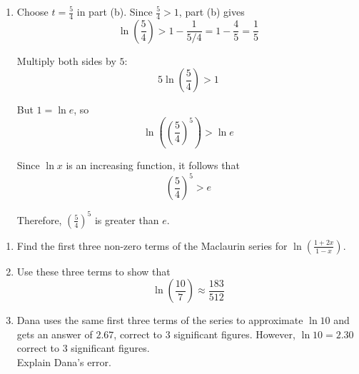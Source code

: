 \documentclass[leqno]{article}
\begin{document}
\begin{enumerate}[
  label=\textbf{\arabic*.},
  leftmargin=*,
  topsep=0pt,
  partopsep=0pt,
  parsep=0pt
]
\begin{djsSolution}
\begin{enumerate}[label=\textbf{(\alph*)}]
  If $t>1$, then $0<x<1$, so part (a) applies:
  \[
  -\ln(1-x)>x
  \]

  Substituting $x=1-\frac1t$ gives
  \begin{align*}
  -\ln\left(1-\left(1-\frac1t\right)\right)&>1-\frac1t \\
  -\ln\left(\frac1t\right)&>1-\frac1t \\
  \ln t&>1-\frac1t
  \end{align*}

  So, for $t>1$:
  \[
  \ln t>1-\frac1t
  \]

  \item Choose $t=\frac54$ in part (b). Since $\frac54>1$, part (b) gives
  \[
  \ln\left(\frac54\right)>1-\frac{1}{5/4}=1-\frac45=\frac15
  \]

  Multiply both sides by $5$:
  \[
  5\ln\left(\frac54\right)>1
  \]

  But $1=\ln e$, so
  \[
  \ln\left(\left(\frac54\right)^5\right)>\ln e
  \]

  Since $\ln x$ is an increasing function, it follows that
  \[
  \left(\frac54\right)^5>e
  \]

  Therefore, $\left(\frac54\right)^5$ is greater than $e$.
\end{enumerate}
\end{djsSolution}


\newpage

\questionitem

\begin{enumerate}[label=\textbf{(\alph*)}]
  \item Find the first three non-zero terms of the Maclaurin series for $\ln\left(\frac{1+2x}{1-x}\right)$.  \\
  \item Use these three terms to show that
  \[
  \ln\left(\dfrac{10}{7}\right) \approx \dfrac{183}{512}
  \]
  \item Dana uses the same first three terms of the series to approximate $\ln 10$ and gets an answer of $2.67$, correct to $3$ significant figures. However, $\ln 10 = 2.30$ correct to $3$ significant figures. \\

  Explain Dana's error.  \\
\end{enumerate}

\vspace*{10pt}


\end{enumerate}
\end{document}

